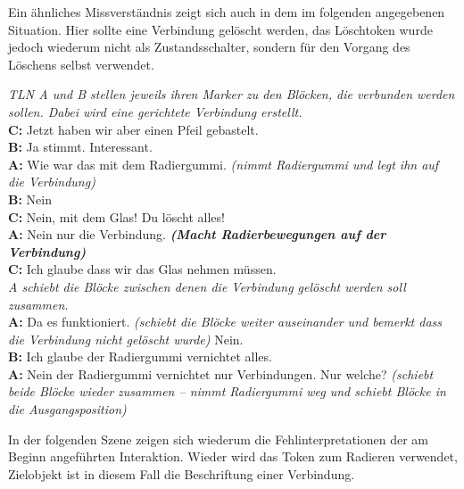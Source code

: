 Ein ähnliches Missverständnis zeigt sich auch in dem im folgenden angegebenen Situation. Hier sollte eine Verbindung gelöscht werden, das Löschtoken wurde jedoch wiederum nicht als Zustandsschalter, sondern für den Vorgang des Löschens selbst verwendet.

\begin{transkript}
	\emph{TLN A und B stellen jeweils ihren Marker zu den Blöcken, die verbunden werden sollen. Dabei wird eine gerichtete Verbindung erstellt.}\\
	\textbf{C:} Jetzt haben wir aber einen Pfeil gebastelt.\\
	\textbf{B:} Ja stimmt. Interessant.\\
	\textbf{A:} Wie war das mit dem Radiergummi. \emph{(nimmt Radiergummi und legt ihn auf die Verbindung)}\\
	\textbf{B:} Nein\\
	\textbf{C:} Nein, mit dem Glas! Du löscht alles!\\
	\textbf{A:} Nein nur die Verbindung. \textbf{\emph{(Macht Radierbewegungen auf der Verbindung)}}\\
	\textbf{C:} Ich glaube dass wir das Glas nehmen müssen.\\
	\emph{A schiebt die Blöcke zwischen denen die Verbindung gelöscht werden soll zusammen.}\\
	\textbf{A:} Da es funktioniert. \emph{(schiebt die Blöcke weiter auseinander und bemerkt dass die Verbindung nicht gelöscht wurde)} Nein.\\
	\textbf{B:} Ich glaube der Radiergummi vernichtet alles.\\
	\textbf{A:} Nein der Radiergummi vernichtet nur Verbindungen. Nur welche? \emph{(schiebt beide Blöcke wieder zusammen – nimmt Radiergummi weg und schiebt Blöcke in die Ausgangsposition)}
\end{transkript}

In der folgenden Szene zeigen sich wiederum die Fehlinterpretationen der am Beginn angeführten Interaktion. Wieder wird das Token zum Radieren verwendet, Zielobjekt ist in diesem Fall die Beschriftung einer Verbindung.

